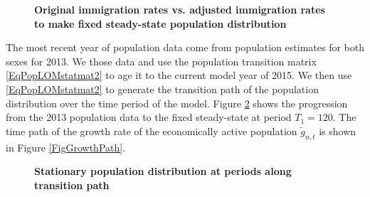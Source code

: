 \documentclass[letterpaper,12pt]{article}
\theoremstyle{definition}
\begin{document}
    \begin{figure}[htbp]\centering \captionsetup{width=4.0in}
      \caption{\label{FigImmRateChg}\textbf{Original immigration rates vs. adjusted immigration rates to make fixed steady-state population distribution}}
    \end{figure}

    The most recent year of population data come from \citet{Census:2015} population estimates for both sexes for 2013. We those data and use the population transition matrix \eqref{EqPopLOMstatmat2} to age it to the current model year of 2015. We then use \eqref{EqPopLOMstatmat2} to generate the transition path of the population distribution over the time period of the model. Figure \ref{FigPopDistPath} shows the progression from the 2013 population data to the fixed steady-state at period $T_1=120$. The time path of the growth rate of the economically active population $\tilde{g}_{n,t}$ is shown in Figure \ref{FigGrowthPath}.

    \begin{figure}[htbp]\centering \captionsetup{width=4.0in}
      \caption{\label{FigPopDistPath}\textbf{Stationary population distribution at periods along transition path}}
    \end{figure}
\end{document}
